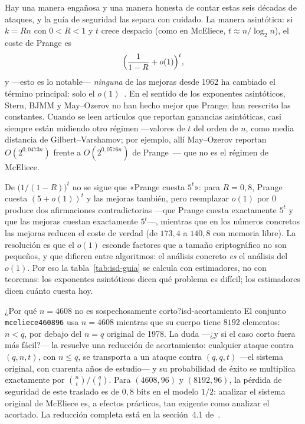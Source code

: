 \documentclass[11pt,a4paper,oneside]{report}
\begin{document}
Hay una manera engañosa y una manera honesta de contar estas seis
décadas de ataques, y la guía de seguridad las separa con cuidado.
La manera asintótica: si $k= Rn$ con $0<R<1$ y $t$ crece despacio
(como en McEliece, $t\approx n/\log_2 n$), el coste de Prange es
\[
  \Bigl(\frac{1}{1-R}+o(1)\Bigr)^{t},
\]
y ---esto es lo notable--- \emph{ninguna} de las mejoras desde 1962
ha cambiado el término principal: solo el $o(1)$~\cite{cmsecurity}.
En el sentido de los exponentes asintóticos, Stern, BJMM y
May--Ozerov no han hecho mejor que Prange; han reescrito las
constantes. Cuando se leen artículos que reportan ganancias
asintóticas, casi siempre están midiendo otro régimen ---valores de
$t$ del orden de $n$, como media distancia de Gilbert--Varshamov; por
ejemplo, allí May--Ozerov reportan $O(2^{0{,}0473n})$ frente a
$O(2^{0{,}0576n})$ de Prange~\cite{mo2015}--- que no es el régimen de
McEliece.

\begin{rigor}[$o(1)$ no es $0$]
De $\bigl(1/(1-R)\bigr)^{t}$ no se sigue que «Prange cuesta
$5^{t}$»: para $R=0{,}8$, Prange cuesta $(5+o(1))^{t}$ y las mejoras
también, pero reemplazar $o(1)$ por $0$ produce dos afirmaciones
contradictorias ---que Prange cuesta exactamente $5^{t}$ y que las
mejoras cuestan exactamente $5^{t}$---, mientras que en los números
concretos las mejoras reducen el coste de verdad (de $173{,}4$ a
$140{,}8$ con memoria libre). La resolución es que el $o(1)$ esconde
factores que a tamaño criptográfico no son pequeños, y que difieren
entre algoritmos: el análisis concreto \emph{es} el análisis del
$o(1)$. Por eso la tabla~\ref{tab:isd-guia} se calcula con
estimadores, no con teoremas: los exponentes asintóticos dicen qué
problema es difícil; los estimadores dicen cuánto cuesta hoy.
\end{rigor}

\begin{observacion}{¿Por qué $n=4608$ no es sospechosamente corto?}{isd-acortamiento}
El conjunto \texttt{mceliece460896} usa $n=4608$ mientras que su
cuerpo tiene $8192$ elementos: $n<q$, por debajo del $n=q$ original
de 1978. La duda ---¿y si el caso corto fuera más fácil?--- la
resuelve una reducción de acortamiento: cualquier ataque contra
$(q,n,t)$, con $n\le q$, se transporta a un ataque contra
$(q,q,t)$ ---el sistema original, con cuarenta años de estudio--- y
su probabilidad de éxito se multiplica exactamente por
$\binom{n}{t}/\binom{q}{t}$. Para $(4608,96)$ y $(8192,96)$, la
pérdida de seguridad de este traslado es de $0{,}8$ bits en el
modelo $1/2$: analizar el sistema original de McEliece es, a efectos
prácticos, tan exigente como analizar el acortado. La reducción
completa está en la sección~4.1 de~\cite{cmsecurity}.
\end{observacion}
\end{document}
